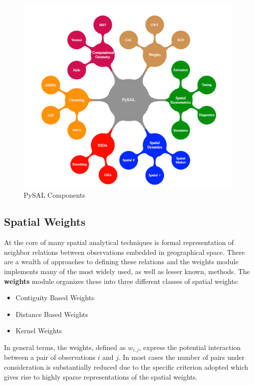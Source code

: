 \documentclass[11pt, titlepage]{amsart}
\begin{document}
\begin{figure}[ht]
\begin{center}
\includegraphics[width=\linewidth]{pysal_components.pdf}
\end{center}
\caption{PySAL Components}
\label{f:pysal}
\end{figure}   

\subsection{Spatial Weights}

At the core of many spatial analytical techniques is formal
representation of neighbor relations between observations embedded in
geographical space. There are a wealth of approaches to defining these
relations and the weights module implements many of the most widely
used, as well as lesser known, methods. The \textbf{weights} module organizes these into three
different classes of spatial weights:

\begin{itemize}
	\item Contiguity Based Weights
	\item Distance Based Weights
	\item Kernel Weights
\end{itemize}

In general terms, the weights, defined as $w_{i,j}$,  express the
potential interaction between a pair of observations $i$ and $j$.
In most cases the number of pairs under consideration is
substantially reduced due to the specific criterion adopted which gives
rise to highly sparse representations of the spatial weights.
\end{document}
